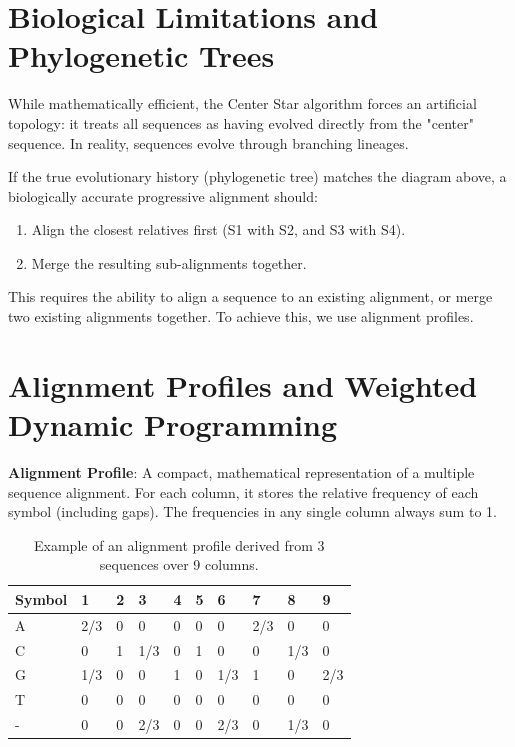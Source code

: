 \documentclass[11pt, a4paper]{article}
\newenvironment{important}
  {\begin{tcolorbox}[colback=blue!5!white, colframe=blue!75!black, arc=1mm, boxrule=1pt]}
  {\end{tcolorbox}}
\begin{document}
\section{Biological Limitations and Phylogenetic Trees}

While mathematically efficient, the Center Star algorithm forces an artificial topology: it treats all sequences as having evolved directly from the "center" sequence. In reality, sequences evolve through branching lineages.


If the true evolutionary history (phylogenetic tree) matches the diagram above, a biologically accurate progressive alignment should:
\begin{enumerate}
    \item Align the closest relatives first (S1 with S2, and S3 with S4).
    \item Merge the resulting sub-alignments together.
\end{enumerate}
This requires the ability to align a sequence to an existing alignment, or merge two existing alignments together. To achieve this, we use alignment profiles.

\section{Alignment Profiles and Weighted Dynamic Programming}

\begin{important}
  \textbf{Alignment Profile}: A compact, mathematical representation of a multiple sequence alignment. For each column, it stores the relative frequency of each symbol (including gaps). The frequencies in any single column always sum to 1.
\end{important}

\begin{table}[htpb]
\centering
\caption{Example of an alignment profile derived from 3 sequences over 9 columns.}
\begin{tabularx}{\textwidth}{l X X X X X X X X X}
\toprule
Symbol & 1 & 2 & 3 & 4 & 5 & 6 & 7 & 8 & 9 \\
\midrule
A & 2/3 & 0   & 0   & 0   & 0   & 0   & 2/3 & 0   & 0 \\
C & 0   & 1   & 1/3 & 0   & 1   & 0   & 0   & 1/3 & 0 \\
G & 1/3 & 0   & 0   & 1   & 0   & 1/3 & 1   & 0   & 2/3 \\
T & 0   & 0   & 0   & 0   & 0   & 0   & 0   & 0   & 0 \\
- & 0   & 0   & 2/3 & 0   & 0   & 2/3 & 0   & 1/3 & 0 \\
\bottomrule
\end{tabularx}
\end{table}
\end{document}
